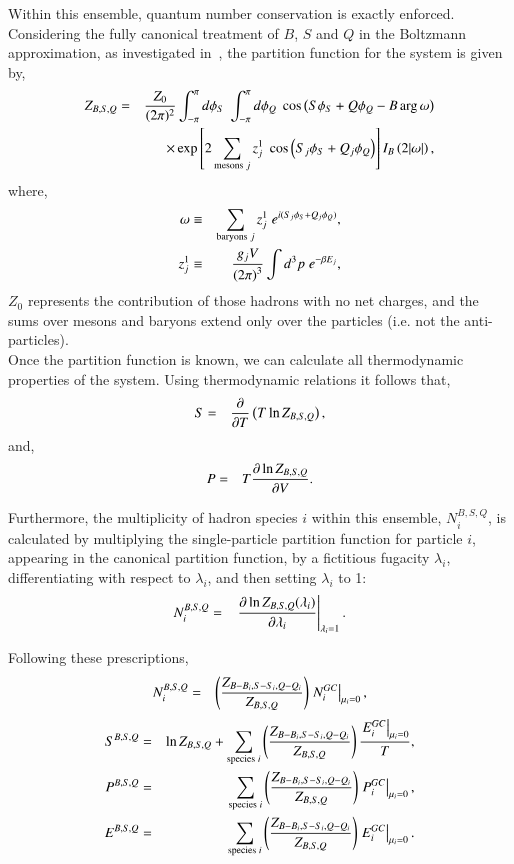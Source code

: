 \documentclass{elsarticle}
\begin{document}
Within this ensemble, quantum number conservation is exactly enforced. Considering the fully canonical treatment of $B$, $S$ 
and $Q$ in the Boltzmann approximation, as investigated 
in~\cite{Keranen:2001pr}, the partition function for the system is given by,
\begin{eqnarray}
Z_{B,S,Q} &=& {Z_0\over(2\pi)^2}\int_{-\pi}^{\pi}d\phi_S\;
\int_{-\pi}^{\pi}d\phi_Q\;\cos\left(S\phi_S + Q\phi_Q  - B\arg\omega\right)\nonumber\\
& &\times\exp\left[2\sum_{\mathrm{mesons}\;j}z_j^1\;\cos\left(S_j\phi_S+Q_j\phi_Q\right)\right]
I_B\left(2|\omega|\right),\label{Eq:BSQ Canonical}
\end{eqnarray}
where,
\begin{eqnarray}
\omega &\equiv& \sum_{\mathrm{baryons}\;j}z_j^1\;e^{i(S_j\phi_S+Q_j\phi_Q)},\nonumber\\
z_j^1 &\equiv& {g_jV\over\left(2\pi\right)^3}\int d^3p\;e^{-\beta E_j},\nonumber
\end{eqnarray}
$Z_0$ represents the contribution of those hadrons with no net charges, and the sums over mesons 
and baryons extend only over the particles (i.e. not the anti-particles).\\

Once the partition function is known, we can calculate all
thermodynamic properties of the system. Using thermodynamic relations it follows that,
\begin{eqnarray}
S &=&{\partial \over\partial T}\left(T\ln Z_{B,S,Q}\right),
\end{eqnarray}
and,
\begin{eqnarray}
P &=&T{\partial\ln Z_{B,S,Q} \over\partial V}.
\end{eqnarray}

Furthermore, the multiplicity of hadron species $i$ within this ensemble, $N_i^{B,S,Q}$, is calculated by 
multiplying the single-particle partition function for particle $i$, appearing in the canonical 
partition function, by a fictitious fugacity $\lambda_i$, differentiating with respect 
to $\lambda_i$, and then setting $\lambda_i$ to 1:
\begin{eqnarray}
  N_i^{B,S,Q} &=& \left.{\partial\ln
  Z_{B,S,Q}({\lambda_i})\over\partial\lambda_i}\right|_{\lambda_i=1}.
\end{eqnarray}

Following these prescriptions,\\
\begin{eqnarray}
  N_i^{B,S,Q} &=& \left({Z_{B-B_i,S-S_i,Q-Q_i}\over
  Z_{B,S,Q}}\right)\left.N_i^{GC}\right|_{\mu_i=0},
\end{eqnarray}
\begin{eqnarray}
  S^{B,S,Q} &=& \ln Z_{B,S,Q} + \sum_{\mathrm{species}\;i} \left({Z_{B-B_i,S-S_i,Q-Q_i}\over
    Z_{B,S,Q}}\right){\left.E_i^{GC}\right|_{\mu_i=0}\over T},\\
  P^{B,S,Q} &=&  \sum_{\mathrm{species}\;i} \left({Z_{B-B_i,S-S_i,Q-Q_i}\over
    Z_{B,S,Q}}\right)\left.P_i^{GC}\right|_{\mu_i=0},\\
  E^{B,S,Q} &=& \sum_{\mathrm{species}\;i} \left({Z_{B-B_i,S-S_i,Q-Q_i}\over
    Z_{B,S,Q}}\right)\left.E_i^{GC}\right|_{\mu_i=0}.
\end{eqnarray}
\end{document}
